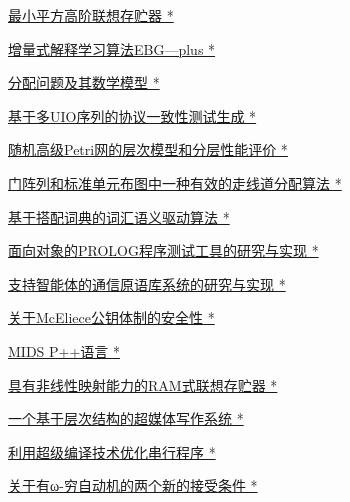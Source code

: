 \documentclass[a4paper]{article}
\begin{document}
\href{http://www.jos.org.cn/ch/reader/download_pdf.aspx?file_no=1995s105&year_id=1995&quarter_id=zk&falg=1}{最小平方高阶联想存贮器 *}

\href{http://www.jos.org.cn/ch/reader/download_pdf.aspx?file_no=1995s106&year_id=1995&quarter_id=zk&falg=1}{增量式解释学习算法EBG—plus *}

\href{http://www.jos.org.cn/ch/reader/download_pdf.aspx?file_no=1995s107&year_id=1995&quarter_id=zk&falg=1}{分配问题及其数学模型 *}

\href{http://www.jos.org.cn/ch/reader/download_pdf.aspx?file_no=1995s108&year_id=1995&quarter_id=zk&falg=1}{基于多UIO序列的协议一致性测试生成 *}

\href{http://www.jos.org.cn/ch/reader/download_pdf.aspx?file_no=1995s109&year_id=1995&quarter_id=zk&falg=1}{随机高级Petri网的层次模型和分层性能评价 *}

\href{http://www.jos.org.cn/ch/reader/download_pdf.aspx?file_no=1995s110&year_id=1995&quarter_id=zk&falg=1}{门阵列和标准单元布图中一种有效的走线道分配算法 *}

\href{http://www.jos.org.cn/ch/reader/download_pdf.aspx?file_no=1995s111&year_id=1995&quarter_id=zk&falg=1}{基于搭配词典的词汇语义驱动算法 *}

\href{http://www.jos.org.cn/ch/reader/download_pdf.aspx?file_no=1995s112&year_id=1995&quarter_id=zk&falg=1}{面向对象的PROLOG程序测试工具的研究与实现 *}

\href{http://www.jos.org.cn/ch/reader/download_pdf.aspx?file_no=1995s113&year_id=1995&quarter_id=zk&falg=1}{支持智能体的通信原语库系统的研究与实现 *}

\href{http://www.jos.org.cn/ch/reader/download_pdf.aspx?file_no=1995s114&year_id=1995&quarter_id=zk&falg=1}{关于McEliece公钥体制的安全性 *}

\href{http://www.jos.org.cn/ch/reader/download_pdf.aspx?file_no=1995s115&year_id=1995&quarter_id=zk&falg=1}{MIDS P++语言 *}

\href{http://www.jos.org.cn/ch/reader/download_pdf.aspx?file_no=1995s116&year_id=1995&quarter_id=zk&falg=1}{具有非线性映射能力的RAM式联想存贮器 *}

\href{http://www.jos.org.cn/ch/reader/download_pdf.aspx?file_no=1995s117&year_id=1995&quarter_id=zk&falg=1}{一个基于层次结构的超媒体写作系统 *}

\href{http://www.jos.org.cn/ch/reader/download_pdf.aspx?file_no=1995s118&year_id=1995&quarter_id=zk&falg=1}{利用超级编译技术优化串行程序 *}

\href{http://www.jos.org.cn/ch/reader/download_pdf.aspx?file_no=1995s119&year_id=1995&quarter_id=zk&falg=1}{关于有ω-穷自动机的两个新的接受条件 *}
\end{document}
